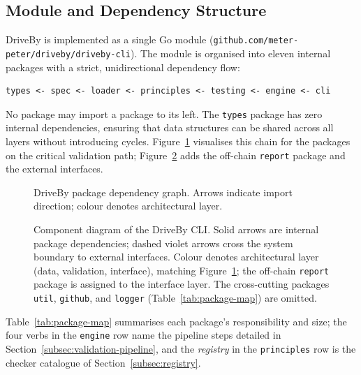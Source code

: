 \subsection{Module and Dependency Structure}
\label{subsec:module-structure}

DriveBy is implemented as a single Go module (\texttt{github.com/\allowbreak meter-peter/\allowbreak driveby/\allowbreak driveby-cli}). The module is organised into eleven internal packages with a strict, unidirectional dependency flow:

{\footnotesize
\begin{verbatim}
types <- spec <- loader <- principles <- testing <- engine <- cli
\end{verbatim}
}

No package may import a package to its left. The \texttt{types} package has zero internal dependencies, ensuring that data structures can be shared across all layers without introducing cycles. Figure~\ref{fig:dependency-flow} visualises this chain for the packages on the critical validation path; Figure~\ref{fig:component-diagram} adds the off-chain \texttt{report} package and the external interfaces.

\begin{figure}[htbp]
\centering

\caption{DriveBy package dependency graph. Arrows indicate import direction; colour denotes architectural layer.}
\label{fig:dependency-flow}
\end{figure}

\begin{figure}[htbp]
\centering
\resizebox{\textwidth}{!}{}
\caption{Component diagram of the DriveBy CLI. Solid arrows are internal package dependencies; dashed violet arrows cross the system boundary to external interfaces. Colour denotes architectural layer (data, validation, interface), matching Figure~\ref{fig:dependency-flow}; the off-chain \texttt{report} package is assigned to the interface layer. The cross-cutting packages \texttt{util}, \texttt{github}, and \texttt{logger} (Table~\ref{tab:package-map}) are omitted.}
\label{fig:component-diagram}
\end{figure}

Table~\ref{tab:package-map} summarises each package's responsibility and size; the four verbs in the \texttt{engine} row name the pipeline steps detailed in Section~\ref{subsec:validation-pipeline}, and the \emph{registry} in the \texttt{principles} row is the checker catalogue of Section~\ref{subsec:registry}.

